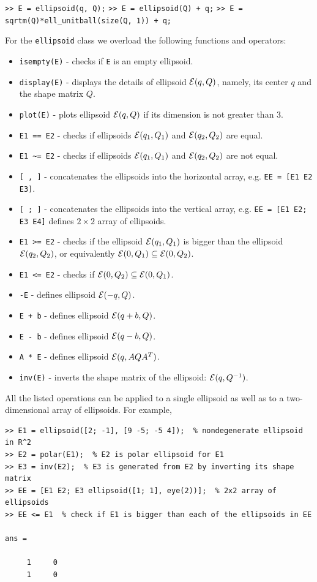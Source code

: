 \documentclass{report}
\newcommand{\EE}{{\cal E}}
\begin{document}
{\tt >> E = ellipsoid(q, Q);}
\newline
{\tt >> E = ellipsoid(Q) + q;}
\newline
{\tt >> E = sqrtm(Q)*ell\_unitball(size(Q, 1)) + q;}

For the {\tt ellipsoid} class we overload the following functions and operators:
\begin{itemize}
\item {\tt isempty(E)} - checks if {\tt E} is an empty ellipsoid.
\item {\tt display(E)} - displays the details of ellipsoid $\EE(q,Q)$, namely,
its center $q$ and the shape matrix $Q$.
\item {\tt plot(E)} - plots ellipsoid $\EE(q,Q)$ if its dimension is not greater
than 3.
\item {\tt E1 == E2} - checks if ellipsoids $\EE(q_1,Q_1)$ and
$\EE(q_2,Q_2)$ are equal.
\item {\tt E1 \~{ }= E2} - checks if ellipsoids $\EE(q_1,Q_1)$ and
$\EE(q_2,Q_2)$ are not equal.
\item {\tt [ , ]} - concatenates the ellipsoids into the horizontal array, e.g.
{\tt EE = [E1 E2 E3]}.
\item {\tt [ ; ]} - concatenates the ellipsoids into the vertical array, e.g.
{\tt EE = [E1 E2; E3 E4]} defines $2\times 2$ array of ellipsoids.
\item {\tt E1 >= E2} - checks if the ellipsoid $\EE(q_1,Q_1)$ is bigger than
the ellipsoid $\EE(q_2,Q_2)$, or equivalently $\EE(0,Q_1)\subseteq\EE(0,Q_2)$.
\item {\tt E1 <= E2} - checks if $\EE(0,Q_2)\subseteq\EE(0,Q_1)$.
\item {\tt -E} - defines ellipsoid $\EE(-q,Q)$.
\item {\tt E + b} - defines ellipsoid $\EE(q+b,Q)$.
\item {\tt E - b} - defines ellipsoid $\EE(q-b,Q)$.
\item {\tt A * E} - defines ellipsoid $\EE(q,AQA^T)$.
\item {\tt inv(E)} - inverts the shape matrix of the ellipsoid: $\EE(q,Q^{-1})$.
\end{itemize}
All the listed operations can be applied to a single ellipsoid as well as to
a two-dimensional array of ellipsoids.
For example,
{\tt \begin{verbatim}
>> E1 = ellipsoid([2; -1], [9 -5; -5 4]);  % nondegenerate ellipsoid in R^2
>> E2 = polar(E1);  % E2 is polar ellipsoid for E1
>> E3 = inv(E2);  % E3 is generated from E2 by inverting its shape matrix
>> EE = [E1 E2; E3 ellipsoid([1; 1], eye(2))];  % 2x2 array of ellipsoids
>> EE <= E1  % check if E1 is bigger than each of the ellipsoids in EE

ans =

     1     0
     1     0
\end{verbatim} }
\end{document}

